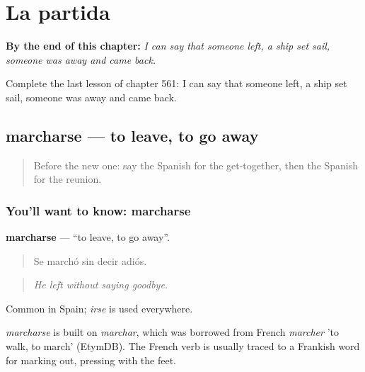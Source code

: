 
\chapter{La partida}
\label{ch:es-la-partida}

\begin{chapteropening}
\textbf{By the end of this chapter:} \emph{I can say that someone left, a ship set sail, someone was away and came back.}

Complete the last lesson of chapter 561: I can say that someone left, a ship set sail, someone was away and came back.
\end{chapteropening}

\section[marcharse]{marcharse — to leave, to go away}

\label{lesson:ES-C561-marcharse}



\begin{quote}
Before the new one: say the Spanish for the get-together, then the Spanish for the reunion.
\end{quote}

\subsection*{You'll want to know: marcharse}
\textbf{marcharse} — \textquotedblleft{}to leave, to go away\textquotedblright{}.

\begin{quote}
Se marchó sin decir adiós.
\end{quote}

\begin{quote}
\emph{He left without saying goodbye.}
\end{quote}

Common in Spain; \emph{irse} is used everywhere.

\begin{cousinweb}
\emph{marcharse} is built on \emph{marchar}, which was borrowed from French \emph{marcher} 'to walk, to march' (EtymDB). The French verb is usually traced to a Frankish word for marking out, pressing with the feet.
\end{cousinweb}

